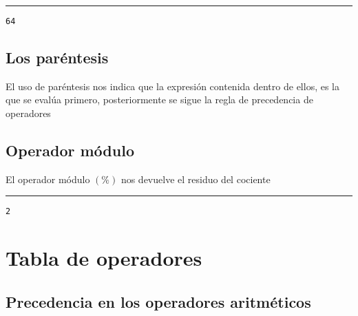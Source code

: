 \documentclass[]{article}
\newenvironment{Shaded}{}{}
\newcommand{\DecValTok}[1]{\textcolor[rgb]{0.25,0.63,0.44}{#1}}
\newcommand{\OperatorTok}[1]{\textcolor[rgb]{0.40,0.40,0.40}{#1}}
\begin{document}
\begin{center}\rule{0.5\linewidth}{\linethickness}\end{center}

\begin{verbatim}
64
\end{verbatim}

\subsection{Los paréntesis}\label{los-paruxe9ntesis}

El uso de paréntesis nos indica que la expresión contenida dentro de
ellos, es la que se evalúa primero, posteriormente se sigue la regla de
precedencia de operadores

\subsection{Operador módulo}\label{operador-muxf3dulo}

El operador módulo \((\%)\) nos devuelve el residuo del cociente

\begin{Shaded}
\end{Shaded}

\begin{center}\rule{0.5\linewidth}{\linethickness}\end{center}

\begin{verbatim}
2
\end{verbatim}

\section{Tabla de operadores}\label{tabla-de-operadores}

\subsection{Precedencia en los operadores
aritméticos}\label{precedencia-en-los-operadores-aritmuxe9ticos}

\subsection{}\label{section}
\end{document}
